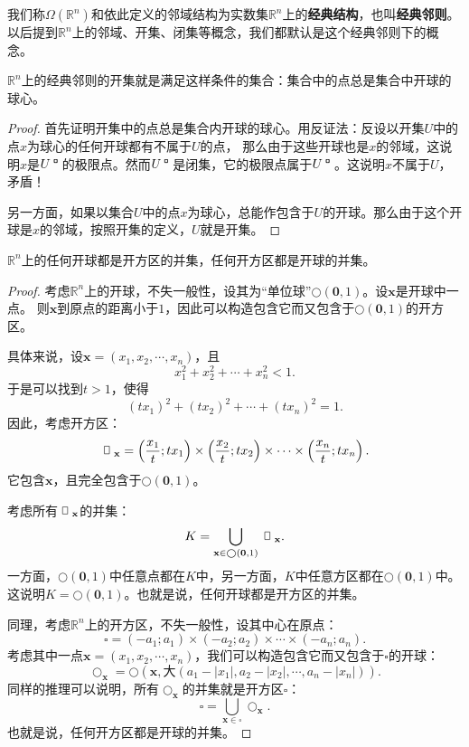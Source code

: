 \documentclass[12pt,UTF8]{ctexbook}
\begin{document}
\begin{appendix}
\begin{df}
    我们称$\Omega(\mathbb{R}^n)$和依此定义的邻域结构为实数集$\mathbb{R}^n$上的\textbf{经典结构}，也叫\textbf{经典邻则}。
    以后提到$\mathbb{R}^n$上的邻域、开集、闭集等概念，我们都默认是这个经典邻则下的概念。
\end{df}

\begin{tm}\label{tm:b-0-10}
    $\mathbb{R}^n$上的经典邻则的开集就是满足这样条件的集合：集合中的点总是集合中开球的球心。
\end{tm}

\begin{proof}
    首先证明开集中的点总是集合内开球的球心。用反证法：反设以开集$U$中的点$x$为球心的任何开球都有不属于$U$的点，
    那么由于这些开球也是$x$的邻域，这说明$x$是$U^{\bu}$的极限点。然而$U^{\bu}$是闭集，它的极限点属于$U^{\bu}$。这说明$x$不属于$U$，矛盾！

    另一方面，如果以集合$U$中的点$x$为球心，总能作包含于$U$的开球。那么由于这个开球是$x$的邻域，按照开集的定义，$U$就是开集。
\end{proof}

\begin{tm}\label{tm:b-1-30}
    $\mathbb{R}^n$上的任何开球都是开方区的并集，任何开方区都是开球的并集。
\end{tm}

\begin{proof}
    考虑$\mathbb{R}^n$上的开球，不失一般性，设其为“单位球”$\bigcirc(\mathbf{0}, 1)$。设$\mathbf{x}$是开球中一点。
    则$\mathbf{x}$到原点的距离小于$1$，因此可以构造包含它而又包含于$\bigcirc(\mathbf{0}, 1)$的开方区。

    具体来说，设$\mathbf{x} = (x_1, x_2, \cdots, x_n)$，且
    $$ x_1^2 + x_2^2 + \cdots + x_n^2 < 1.$$
    于是可以找到$t>1$，使得
    $$ (tx_1)^2 + (tx_2)^2 + \cdots + (tx_n)^2 = 1.$$
    因此，考虑开方区：
    $$ \rectbx_{\mathbf{x}} = \left(\frac{x_1}{t};tx_1\right)\times\left(\frac{x_2}{t};tx_2\right)\times\cdots\times\left(\frac{x_n}{t};tx_n\right).$$
    它包含$\mathbf{x}$，且完全包含于$\bigcirc(\mathbf{0}, 1)$。

    考虑所有$\rectbx_{\mathbf{x}}$的并集：
    $$ K = \bigcup_{\mathbf{x}\in \bigcirc(\mathbf{0}, 1)} \rectbx_{\mathbf{x}}. $$
    一方面，$\bigcirc(\mathbf{0}, 1)$中任意点都在$K$中，另一方面，$K$中任意方区都在$\bigcirc(\mathbf{0}, 1)$中。
    这说明$K = \bigcirc(\mathbf{0}, 1)$。也就是说，任何开球都是开方区的并集。

    同理，考虑$\mathbb{R}^n$上的开方区，不失一般性，设其中心在原点：
    $$ \square = (-a_1;a_1)\times(-a_2;a_2)\times\cdots\times(-a_n;a_n). $$
    考虑其中一点$\mathbf{x} = (x_1, x_2, \cdots, x_n)$，我们可以构造包含它而又包含于$\square$的开球：
    $$ \bigcirc_{\mathbf{x}} = \bigcirc(\mathbf{x}, \text{大}(a_1 - |x_1|, a_2 - |x_2|, \cdots, a_n - |x_n|)). $$
    同样的推理可以说明，所有$\bigcirc_{\mathbf{x}}$的并集就是开方区$\square$：
    $$ \square = \bigcup_{\mathbf{x}\in \square} \bigcirc_{\mathbf{x}}. $$
    也就是说，任何开方区都是开球的并集。


\end{proof}
\end{appendix}
\end{document}
